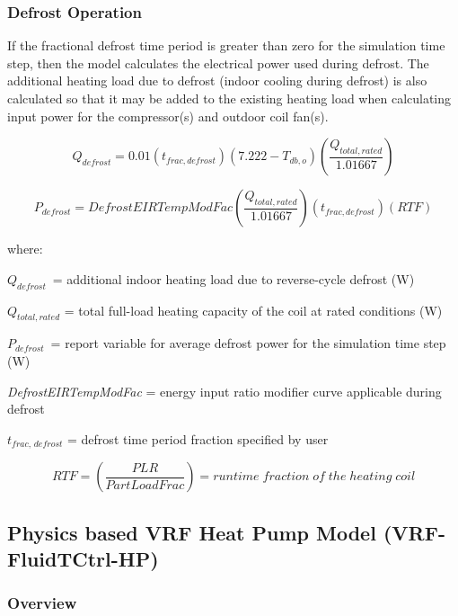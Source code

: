\subsubsection{Defrost Operation}\label{defrost-operation-201605050925}

If the fractional defrost time period is greater than zero for the simulation time step, then the model calculates the electrical power used during defrost. The additional heating load due to defrost (indoor cooling during defrost) is also calculated so that it may be added to the existing heating load when calculating input power for the compressor(s) and outdoor coil fan(s).

\begin{equation}
  Q_{defrost} = 0.01 \left( t_{frac,defrost} \right) \left( 7.222 - T_{db,o} \right) \left( \frac{Q_{total,rated}}{1.01667} \right)
\end{equation}

\begin{equation}
  P_{defrost} = DefrostEIRTempModFac \left( \frac{Q_{total,rated}}{1.01667} \right) \left( t_{frac,defrost} \right) \left( RTF \right)
\end{equation}

where:

\(Q_{defrost}\) = additional indoor heating load due to reverse-cycle defrost (W)

\(Q_{total,rated}\) = total full-load heating capacity of the coil at rated conditions (W)

\(P_{defrost}\) = report variable for average defrost power for the simulation time step (W)

\emph{DefrostEIRTempModFac} = energy input ratio modifier curve applicable during defrost

\(t_{frac,\,defrost}\) = defrost time period fraction specified by user

\begin{equation}
  RTF = \left(  \frac{PLR}{PartLoadFrac} \right) = runtime\;fraction\;of\;the\;heating\;coil
\end{equation}

\subsection{Physics based VRF Heat Pump Model (VRF-FluidTCtrl-HP)}\label{VRF-FluidTCtrl-HP}

\subsubsection{Overview}\label{VRF-FluidTCtrl-HP-overview}

